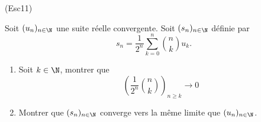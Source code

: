 \begin{tiny}(Esc11)\end{tiny} Soit $(u_{n})_{n\in \N}$ une suite r{\'e}elle convergente. Soit $(s_{n})_{n\in \N}$ définie par
\begin{displaymath}
  s_{n}=\frac{1}{2^{n}}\sum_{k=0}^{n}\binom{n}{k}u_{k}\text{.}
\end{displaymath}
\begin{enumerate}
  \item Soit $k\in \N$, montrer que
\begin{displaymath}
  \left( \frac{1}{2^n}\binom{n}{k}\right)_{n\geq k} \longrightarrow 0
\end{displaymath}
  \item Montrer que $(s_{n})_{n\in \N}$ converge vers la même limite que $(u_{n})_{n\in \N}$.
\end{enumerate}